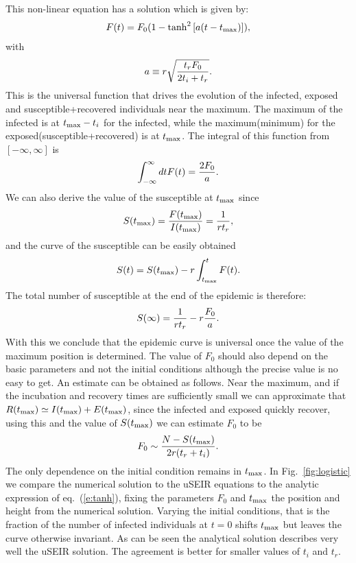 \documentclass[a4paper,oneside,11pt]{article}
\begin{document}
 This non-linear equation has a solution which is given by:
\begin{eqnarray}
F(t) = F_0 \large(1 - \tanh^2\left[ a (t-t_{\rm max})\right]\large),
\label{eq:tanh}
\end{eqnarray}
with
\begin{eqnarray}
a\equiv r \sqrt{{t_r F_0\over 2 t_i+t_r}}.
\label{eq:a}
\end{eqnarray}
This is the universal function that drives the evolution of the infected, exposed and susceptible+recovered individuals near the maximum. The maximum of the infected is at $t_{\rm max}-t_i$ for the infected, while the maximum(minimum) for the exposed(susceptible+recovered) is at $t_{\rm max}$. The integral of this function from $[-\infty, \infty]$ is
\begin{eqnarray}
\int_{-\infty}^{\infty} dt F(t) = {2 F_0 \over a}.
\end{eqnarray}
We can also derive the value of the susceptible at $t_{\rm max}$ since
\begin{eqnarray}
S(t_{\rm max}) = {F(t_{\rm max}) \over I(t_{\rm max})} = {1  \over r t_r},
\end{eqnarray}
and the curve of the susceptible can be easily obtained
\begin{eqnarray}
S(t) = S(t_{\rm max}) - r \int_{t_{\rm max}}^t F(t).
\end{eqnarray}
The total number of susceptible at the end of the epidemic is therefore:
\begin{eqnarray}
S(\infty) = {1\over r t_r } - r {F_0\over a}.
\end{eqnarray}
With this we conclude that the epidemic curve is universal once the value of the maximum position is determined. The value of $F_0$ should also
depend on the basic parameters and not the initial conditions although
the precise value is no easy to get. An estimate can be obtained as follows. Near the maximum, and if the incubation and recovery times are sufficiently small we can approximate that $R(t_{\rm max}) \simeq I(t_{\rm max}) + E(t_{\rm max})$, since the infected and exposed quickly recover, using this and the value of $S(t_{\rm max})$ we can estimate $F_0$ to be
\begin{eqnarray}
F_0 \sim {N-S(t_{\rm max})\over 2 r (t_r +  t_i)}.
\end{eqnarray}
The only dependence on the initial condition remains in $t_{\rm max}$.
In Fig.~\ref{fig:logistic} we compare the numerical solution to the uSEIR equations to the analytic expression of eq.~(\ref{e:tanh}), fixing the parameters $F_0$ and $t_{\rm max}$  the position and height from the numerical solution. Varying the initial conditions, that is the fraction of the number of infected individuals at $t=0$ shifts $t_{\rm max}$ but leaves the curve otherwise invariant. As can be seen the analytical solution describes very well the uSEIR solution. The agreement is better for smaller values of $t_i$ and $t_r$. 
\end{document}
